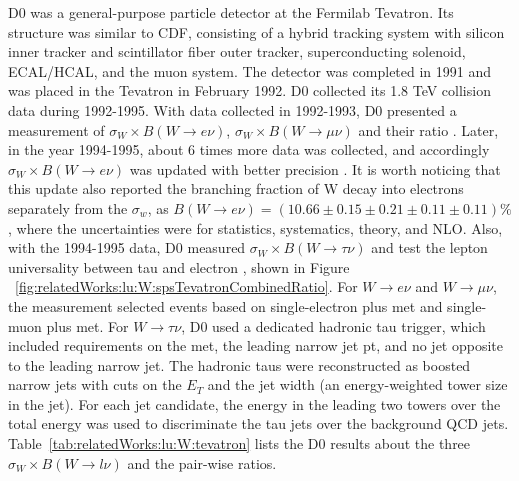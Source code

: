 D0 was a general-purpose particle detector at the Fermilab Tevatron. Its structure was similar to CDF, consisting of a hybrid tracking system with silicon inner tracker and scintillator fiber outer tracker, superconducting solenoid, ECAL/HCAL, and the muon system. The detector was completed in 1991 and was placed in the Tevatron in February 1992. D0 collected its 1.8 TeV collision data during 1992-1995. With data collected in 1992-1993, D0 presented a measurement of $\sigma_W \times B(W\to e\nu)$, $\sigma_W \times B(W\to \mu \nu)$ and their ratio \cite{Abachi:1995xc}. Later, in the year 1994-1995, about 6 times more data was collected, and accordingly $\sigma_W \times B(W\to e\nu)$ was updated with better precision \cite{Abbott:1999tt}. It is worth noticing that this update \cite{Abbott:1999tt} also reported the branching fraction of W decay into electrons separately from the $\sigma_w$, as $B(W\to e\nu)=(10.66\pm0.15\pm0.21\pm0.11\pm0.11)\%$, where the uncertainties were for statistics, systematics, theory, and NLO. Also, with the 1994-1995 data, D0 measured $\sigma_W \times B(W\to \tau \nu)$ and test the lepton universality between tau and electron \cite{Abbott:1999pk}, shown in Figure ~\ref{fig:relatedWorks:lu:W:spsTevatronCombinedRatio}. For $W \to e \nu$ and $W \to \mu \nu$, the measurement selected events based on single-electron plus met and single-muon plus met. For $W \to \tau \nu$, D0 used a dedicated hadronic tau trigger, which included requirements on the met, the leading narrow jet pt, and no jet opposite to the leading narrow jet. The hadronic taus were reconstructed as boosted narrow jets with cuts on the $E_T$ and the jet width (an energy-weighted tower size in the jet). For each jet candidate, the energy in the leading two towers over the total energy was used to discriminate the tau jets over the background QCD jets. Table~\ref{tab:relatedWorks:lu:W:tevatron} lists the D0 results about the three $\sigma_W \times B(W\to l \nu)$ and the pair-wise ratios. 











